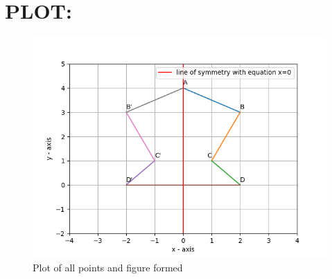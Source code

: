 \documentclass[journal,12pt,twocolumn]{IEEEtran}
\begin{document}
  \section{PLOT:}

 \begin{figure}[h]
 	\centering
 	\includegraphics[scale=0.7]{./Figs/Figure_1.png}
 	  \caption{Plot of all points and figure formed}
 \end{figure}
\end{document}
